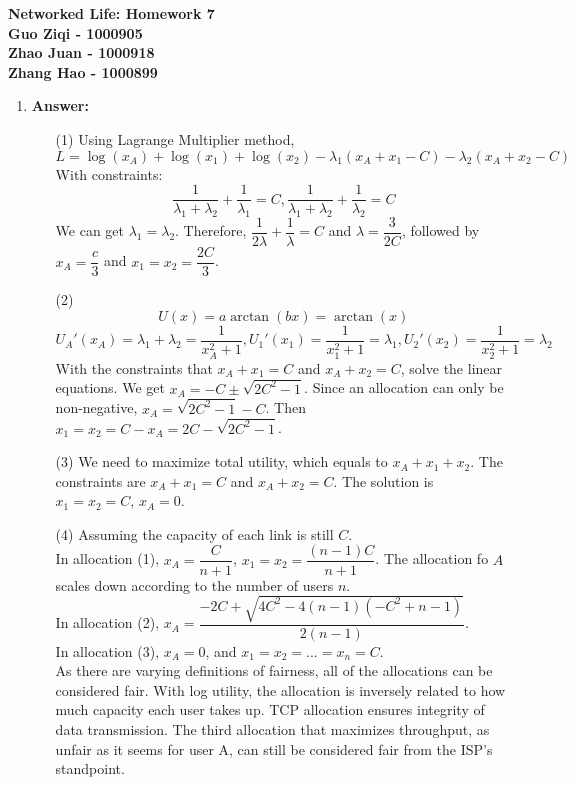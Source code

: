 \documentclass[12pt]{article}
\begin{document}
\begin{center}
\large\bf Networked Life: Homework 7
\medskip\\
Guo Ziqi - 1000905\\
Zhao Juan - 1000918\\
Zhang Hao - 1000899
\end{center}

\begin{enumerate}

\item{} \textbf{Answer:}
\begin{itemize}
\item[(1)]
Using Lagrange Multiplier method,
$$L=\log (x_A)+\log (x_1)+\log (x_2) - \lambda_1(x_A+x_1-C) - \lambda_2(x_A+x_2-C)$$
With constraints:\\
$$\dfrac{1}{\lambda_1+\lambda_2}+\dfrac{1}{\lambda_1}=C, \dfrac{1}{\lambda_1+\lambda_2}+\dfrac{1}{\lambda_2}=C$$
We can get $\lambda_1=\lambda_2$. Therefore, $\dfrac{1}{2\lambda}+\dfrac{1}{\lambda}=C$ and $\lambda=\dfrac{3}{2C}$, followed by $x_A=\dfrac{c}{3}$ and $x_1=x_2=\dfrac{2C}{3}$.

\item[(2)]$$U(x)=a\arctan(bx)=\arctan(x)$$
$$U_A'(x_A)=\lambda_1+\lambda_2=\dfrac{1}{x_A^2+1},U_1'(x_1)=\dfrac{1}{x_1^2+1}=\lambda_1,U_2'(x_2)=\dfrac{1}{x_2^2+1}=\lambda_2$$
With the constraints that $x_A+x_1=C$ and $x_A+x_2=C$, solve the linear equations.
We get $x_A=-C\pm \sqrt{2C^2-1}$. Since an allocation can only be non-negative, $x_A=\sqrt{2C^2-1}-C$. Then $x_1=x_2=C-x_A=2C-\sqrt{2C^2-1}$.

\item[(3)] We need to maximize total utility, which equals to $x_A+x_1+x_2$. The constraints are $x_A+x_1=C$ and $x_A+x_2=C$. The solution is $x_1=x_2=C$, $x_A=0$.

\item[(4)] Assuming the capacity of each link is still $C$.
\medskip\\
In allocation (1), $x_A=\dfrac{C}{n+1}$, $x_1=x_2=\dfrac{(n-1)C}{n+1}$. The allocation fo $A$ scales down according to the number of users $n$.\medskip\\
In allocation (2), $x_A=\dfrac{-2C+\sqrt{4C^2-4(n-1)(-C^2+n-1)}}{2(n-1)}$.\medskip\\
In allocation (3), $x_A=0$, and $x_1=x_2=...=x_n=C$.\medskip\\
As there are varying definitions of fairness, all of the allocations can be considered fair. With log utility, the allocation is inversely related to how much capacity each user takes up. TCP allocation ensures integrity of data transmission. The third allocation that maximizes throughput, as unfair as it seems for user A, can still be considered fair from the ISP's standpoint.
\end{itemize}


\end{enumerate}
\end{document}

